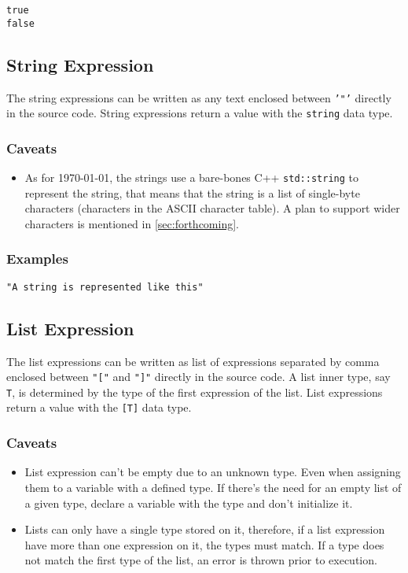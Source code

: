 \begin{verbatim}
true
false
\end{verbatim}

\subsection{String Expression}

The string expressions can be written as any text enclosed between \texttt{'"'} directly in the source code.
String expressions return a value with the \texttt{string} data type.

\subsubsection{Caveats}

\begin{itemize}
    \item As for \today, the strings use a bare-bones C++ \texttt{std::string} to represent the string, that means that the string
        is a list of single-byte characters (characters in the ASCII character table). A plan to support wider characters is mentioned in \autoref{sec:forthcoming}.
\end{itemize}

\subsubsection{Examples}

\begin{verbatim}
"A string is represented like this"
\end{verbatim}

\subsection{List Expression}

The list expressions can be written as list of expressions separated by comma enclosed between \texttt{"["} and \texttt{"]"}
directly in the source code. A list inner type, say \texttt{T}, is determined by the type of the first expression of the list.
List expressions return a value with the \texttt{[T]} data type.

\subsubsection{Caveats}

\begin{itemize}
    \item List expression can't be empty due to an unknown type. Even when assigning them to a variable with a defined type. If there's the
        need for an empty list of a given type, declare a variable with the type and don't initialize it.
    \item Lists can only have a single type stored on it, therefore, if a list expression have more than one expression on it, the types
        must match. If a type does not match the first type of the list, an error is thrown prior to execution.
\end{itemize}


